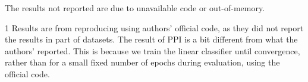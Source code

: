 \begin{table*}[htbp]
\begin{threeparttable}
\begin{tabular}{c|c|cccccc}
        \bottomrule[1.2pt]
    \end{tabular}
     \begin{tablenotes}
        \footnotesize
        \item[] The results not reported are due to unavailable code or out-of-memory.
        \item[1] Results are from reproducing using authors' official code, as they did not report the results in part of datasets. The result of PPI is a bit different from what the authors' reported. This is because we train the linear classifier until convergence, rather than for a small fixed number of epochs during evaluation, using the official code.
    \end{tablenotes}

    \end{threeparttable}
    \label{tab:node_clf}
\end{table*}

